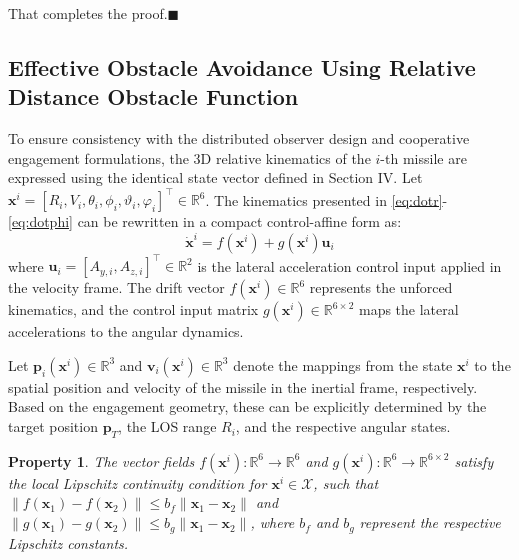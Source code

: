 \documentclass[lettersize,journal]{IEEEtran}
\newtheorem{property}{Property}
\begin{document}
That completes the proof.\hfill $\blacksquare$




\subsection{Effective Obstacle Avoidance Using Relative Distance Obstacle Function}
To ensure consistency with the distributed observer design and cooperative engagement formulations, the 3D relative kinematics of the $i$-th missile are expressed using the identical state vector defined in Section IV. Let $\mathbf{x}^i = [R_i, V_i, \theta_i, \phi_i, \vartheta_i, \varphi_i]^\top \in \mathbb{R}^6$. The kinematics presented in \eqref{eq:dotr}-\eqref{eq:dotphi} can be rewritten in a compact control-affine form as:
\begin{equation}
	\label{obs_state}
	\dot{\mathbf{x}}^i = f(\mathbf{x}^i) + g(\mathbf{x}^i)\mathbf{u}_i
\end{equation}
where $\mathbf{u}_i = [A_{y,i}, A_{z,i}]^\top \in \mathbb{R}^2$ is the lateral acceleration control input applied in the velocity frame. The drift vector $f(\mathbf{x}^i) \in \mathbb{R}^6$ represents the unforced kinematics, and the control input matrix $g(\mathbf{x}^i) \in \mathbb{R}^{6 \times 2}$ maps the lateral accelerations to the angular dynamics. 

Let $\mathbf{p}_i(\mathbf{x}^i) \in \mathbb{R}^3$ and $\mathbf{v}_i(\mathbf{x}^i) \in \mathbb{R}^3$ denote the mappings from the state $\mathbf{x}^i$ to the spatial position and velocity of the missile in the inertial frame, respectively. Based on the engagement geometry, these can be explicitly determined by the target position $\mathbf{p}_T$, the LOS range $R_i$, and the respective angular states.

\vspace{1mm}
\begin{property}
	\label{Lipschitz}
	The vector fields $f(\mathbf{x}^i): \mathbb{R}^6 \rightarrow \mathbb{R}^6$ and $g(\mathbf{x}^i): \mathbb{R}^6 \rightarrow \mathbb{R}^{6 \times 2}$ satisfy the local Lipschitz continuity condition for $\mathbf{x}^i \in \mathcal{X}$, such that $\|f(\mathbf{x}_1) - f(\mathbf{x}_2)\| \le b_f \|\mathbf{x}_1 - \mathbf{x}_2\|$ and $\|g(\mathbf{x}_1) - g(\mathbf{x}_2)\| \le b_g \|\mathbf{x}_1 - \mathbf{x}_2\|$, where $b_f$ and $b_g$ represent the respective Lipschitz constants.
\end{property}
\vspace{1mm}
\end{document}
